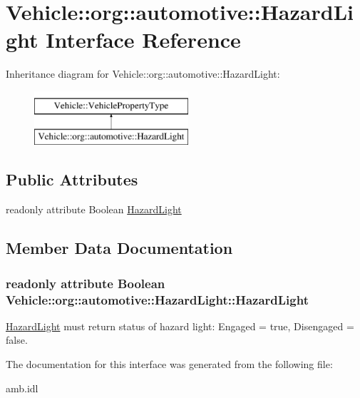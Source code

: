 \hypertarget{interfaceVehicle_1_1org_1_1automotive_1_1HazardLight}{\section{Vehicle\-:\-:org\-:\-:automotive\-:\-:Hazard\-Light Interface Reference}
\label{interfaceVehicle_1_1org_1_1automotive_1_1HazardLight}
}
Inheritance diagram for Vehicle\-:\-:org\-:\-:automotive\-:\-:Hazard\-Light\-:\begin{figure}[H]
\begin{center}
\leavevmode
\includegraphics[height=2.000000cm]{interfaceVehicle_1_1org_1_1automotive_1_1HazardLight}
\end{center}
\end{figure}
\subsection*{Public Attributes}
\begin{DoxyCompactItemize}
\item 
readonly attribute Boolean \hyperlink{interfaceVehicle_1_1org_1_1automotive_1_1HazardLight_a4b1278c12584d7c3d88f6eef025983a3}{Hazard\-Light}
\end{DoxyCompactItemize}


\subsection{Member Data Documentation}
\hypertarget{interfaceVehicle_1_1org_1_1automotive_1_1HazardLight_a4b1278c12584d7c3d88f6eef025983a3}{
\subsubsection[{Hazard\-Light}]{\setlength{\rightskip}{0pt plus 5cm}readonly attribute Boolean Vehicle\-::org\-::automotive\-::\-Hazard\-Light\-::\-Hazard\-Light}}\label{interfaceVehicle_1_1org_1_1automotive_1_1HazardLight_a4b1278c12584d7c3d88f6eef025983a3}
\hyperlink{interfaceVehicle_1_1org_1_1automotive_1_1HazardLight}{Hazard\-Light} must return status of hazard light\-: Engaged = true, Disengaged = false. 

The documentation for this interface was generated from the following file\-:\begin{DoxyCompactItemize}
\item 
amb.\-idl\end{DoxyCompactItemize}

